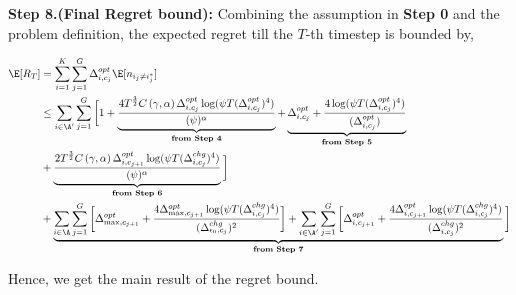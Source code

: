 \begin{customproof}{3}
\textbf{Step 8.(Final Regret bound):} Combining the assumption in \textbf{Step 0} and the problem definition, the expected regret till the $T$-th timestep is bounded by,

\begin{align*}
\E[R_{T}]&= \sum_{i = 1}^K\sum_{j=1}^{G}\Delta^{opt}_{i,c_j}\E[n_{i_j\neq i^*_{j}}] \\
& \leq \sum_{i\in\A'}\sum_{j=1}^{G}\bigg[ 1 
+ \underbrace{ \dfrac{4T^{\frac{3}{2}}C\left( \gamma,\alpha\right)\Delta^{opt}_{i,c_j}\log(\psi T (\Delta^{opt}_{i,c_j})^4)}{(\psi)^{\alpha}} }_{\textbf{from Step 4}}
+ \underbrace{\Delta^{opt}_{i,c_j} + \dfrac{4\log(\psi T(\Delta^{opt}_{i,c_j})^4)}{(\Delta^{opt}_{i,c_j})}}_{\textbf{from Step 5}}\\
& + \underbrace{ \dfrac{2T^{\frac{3}{2}}C\left( \gamma,\alpha\right)\Delta^{opt}_{i,c_{j+1}}\log(\psi T (\Delta^{chg}_{i,c_j})^4)}{(\psi)^{\alpha}} }_{\textbf{from Step 6}}\bigg]\\
&+ \underbrace{ \sum_{i\in\A}\sum_{j=1}^{G}\bigg[\Delta^{opt}_{\max,c_{j+1}} + \dfrac{4\Delta^{opt}_{\max,c_{j+1}}\log(\psi T(\Delta^{chg}_{i,c_j})^4)}{(\Delta^{chg}_{\epsilon_0,c_j})^2}\bigg] + \sum_{i\in\A'}\sum_{j=1}^{G}\bigg[\Delta^{opt}_{i,c_{j+1}} + \dfrac{4\Delta^{opt}_{i,c_{j+1}}\log(\psi T(\Delta^{chg}_{i,c_j})^4)}{(\Delta^{chg}_{i,c_j})^2}}_{\textbf{from Step 7}}
\bigg]
\end{align*}

Hence, we get the main result of the regret bound.

\end{customproof}

